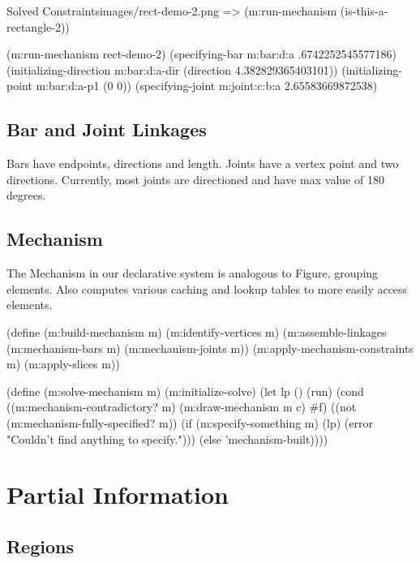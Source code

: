 \begin{img-example}{Solved Constraints}{images/rect-demo-2.png}
=> (m:run-mechanism (is-this-a-rectangle-2))

(m:run-mechanism rect-demo-2)
(specifying-bar m:bar:d:a .6742252545577186)
(initializing-direction m:bar:d:a-dir (direction 4.382829365403101))
(initializing-point m:bar:d:a-p1 (0 0))
(specifying-joint m:joint:c:b:a 2.65583669872538)
\end{img-example}


\subsection{Bar and Joint Linkages}

Bars have endpoints, directions and length. Joints have a vertex point
and two directions. Currently, most joints are directioned and have
max value of 180 degrees.

\subsection{Mechanism}

The Mechanism in our declarative system is analogous to Figure,
grouping elements. Also computes various caching and lookup tables to
more easily access elements.

\begin{code-listing}
(define (m:build-mechanism m)
  (m:identify-vertices m)
  (m:assemble-linkages (m:mechanism-bars m)
                       (m:mechanism-joints m))
  (m:apply-mechanism-constraints m)
  (m:apply-slices m))

(define (m:solve-mechanism m)
  (m:initialize-solve)
  (let lp ()
    (run)
    (cond ((m:mechanism-contradictory? m)
           (m:draw-mechanism m c)
           #f)
          ((not (m:mechanism-fully-specified? m))
           (if (m:specify-something m)
               (lp)
               (error "Couldn't find anything to specify.")))
          (else 'mechanism-built))))
\end{code-listing}

\section{Partial Information}

\subsection{Regions}

